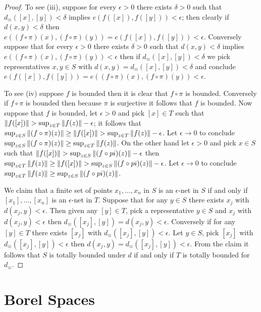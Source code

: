 \begin{proof}
To see (iii), suppose for every $\epsilon > 0$ there exists $\delta>0$ such that $d_\equiv([x], [y]) < \delta$ implies $e(f([x]), f([y])) < \epsilon$; then clearly if $d(x,y) < \delta$ then $e((f\circ \pi)(x), (f \circ \pi)(y)) = e(f([x]), f([y])) < \epsilon$.  Conversely suppose that for every $\epsilon > 0$ there exists $\delta>0$ such that $d(x,y) < \delta$ implies $e((f\circ \pi)(x), (f \circ \pi)(y)) < \epsilon$ then if $d_\equiv([x], [y]) < \delta$ we pick representatives $x,y \in S$ with $d(x,y) = d_\equiv([x], [y]) < \delta$ and conclude $e(f([x]), f([y])) = e((f\circ \pi)(x), (f \circ \pi)(y))< \epsilon$.

To see (iv) suppose $f$ is bounded then it is clear that $f \circ \pi$ is bounded.  Conversely if $f \circ \pi$ is bounded then because $\pi$ is surjective it follows that $f$ is bounded.  Now suppose that $f$ is bounded, let $\epsilon > 0$ and pick $[x] \in T$ such that $\left \lVert f([x]) \right \rVert > \sup_{z \in T} \left \lVert f(z) \right \rVert - \epsilon$; it follows that $\sup_{z \in S} \left \lVert (f \circ \pi)(z) \right \rVert \geq \left \lVert f([x]) \right \rVert > \sup_{z \in T} \left \lVert f(z) \right \rVert - \epsilon$.  Let $\epsilon \to 0$ to conclude $\sup_{z \in S} \left \lVert (f \circ \pi)(z) \right \rVert \geq \sup_{z \in T} \left \lVert f(z) \right \rVert$.  On the other hand let $\epsilon > 0$ and pick $x \in S$ such that $\left \lVert f([x]) \right \rVert > \sup_{z \in S} \left \lVert (f \circ pi)(z) \right \rVert - \epsilon$ then $\sup_{z \in T} \left \lVert f(z) \right \rVert \geq \left \lVert f([x]) \right \rVert > \sup_{z \in S} \left \lVert (f \circ pi)(z) \right \rVert - \epsilon$.  Let $\epsilon \to 0$ to conclude $\sup_{z \in T} \left \lVert f(z) \right \rVert \geq \sup_{z \in S} \left \lVert (f \circ pi)(z) \right \rVert$.

We claim that a finite set of points $x_1, \dotsc, x_n$ in $S$ is an $\epsilon$-net in $S$ if and only if $[x_1], \dotsc, [x_n]$ is an $\epsilon$-net in $T$.  Suppose that for any $y \in S$ there exists $x_j$ with $d(x_j,y) < \epsilon$.  Then given any $[y] \in T$, pick a representative $y \in S$ and $x_j$ with $d(x_j,y) < \epsilon$
then $d_\equiv([x_j], [y]) = d(x_j,y) < \epsilon$.  Conversely if for any $[y] \in T$ there exists $[x_j]$ with $d_\equiv([x_j], [y]) < \epsilon$.  Let $y \in S$, pick $[x_j]$ with $d_\equiv([x_j], [y]) < \epsilon$ then $d(x_j,y)  = d_\equiv([x_j], [y]) < \epsilon$.   From the claim it follows that $S$ is totally bounded under $d$ if and only if $T$ is totally bounded for $d_\equiv$.  
\end{proof}

\section{Borel Spaces}

